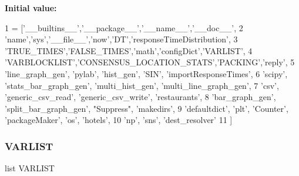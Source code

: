 {\bfseries Initial value\+:}
\begin{DoxyCode}
1 =  [\textcolor{stringliteral}{'\_\_builtins\_\_'},\textcolor{stringliteral}{'\_\_package\_\_'},\textcolor{stringliteral}{'\_\_name\_\_'},\textcolor{stringliteral}{'\_\_doc\_\_'},
2                 \textcolor{stringliteral}{'name'},\textcolor{stringliteral}{'sys'},\textcolor{stringliteral}{'\_\_file\_\_'},\textcolor{stringliteral}{'now'},\textcolor{stringliteral}{'DT'},\textcolor{stringliteral}{'responseTimeDistribution'},
3                 \textcolor{stringliteral}{'TRUE\_TIMES'},\textcolor{stringliteral}{'FALSE\_TIMES'},\textcolor{stringliteral}{'math'},\textcolor{stringliteral}{'configDict'},\textcolor{stringliteral}{'VARLIST'},
4                 \textcolor{stringliteral}{'VARBLOCKLIST'},\textcolor{stringliteral}{'CONSENSUS\_LOCATION\_STATS'},\textcolor{stringliteral}{'PACKING'},\textcolor{stringliteral}{'reply'},
5                 \textcolor{stringliteral}{'line\_graph\_gen'}, \textcolor{stringliteral}{'pylab'}, \textcolor{stringliteral}{'hist\_gen'}, \textcolor{stringliteral}{'SIN'}, \textcolor{stringliteral}{'importResponseTimes'},
6                 \textcolor{stringliteral}{'scipy'}, \textcolor{stringliteral}{'stats\_bar\_graph\_gen'}, \textcolor{stringliteral}{'multi\_hist\_gen'}, \textcolor{stringliteral}{'multi\_line\_graph\_gen'},
7                 \textcolor{stringliteral}{'csv'}, \textcolor{stringliteral}{'generic\_csv\_read'}, \textcolor{stringliteral}{'generic\_csv\_write'}, \textcolor{stringliteral}{'restaurants'},
8                 \textcolor{stringliteral}{'bar\_graph\_gen'}, \textcolor{stringliteral}{'split\_bar\_graph\_gen'}, \textcolor{stringliteral}{"Suppress"}, \textcolor{stringliteral}{'makedirs'},
9                 \textcolor{stringliteral}{'defaultdict'}, \textcolor{stringliteral}{'plt'}, \textcolor{stringliteral}{'Counter'}, \textcolor{stringliteral}{'packageMaker'}, \textcolor{stringliteral}{'os'}, \textcolor{stringliteral}{'hotels'},
10                 \textcolor{stringliteral}{'np'}, \textcolor{stringliteral}{'sns'}, \textcolor{stringliteral}{'dest\_resolver'}
11                 ]
\end{DoxyCode}
\mbox{\label{namespacereorder_abad4087652ccca08b33c499c7aad17b0}} 
\subsubsection{\texorpdfstring{V\+A\+R\+L\+I\+ST}{VARLIST}}
{\footnotesize\ttfamily list V\+A\+R\+L\+I\+ST}

